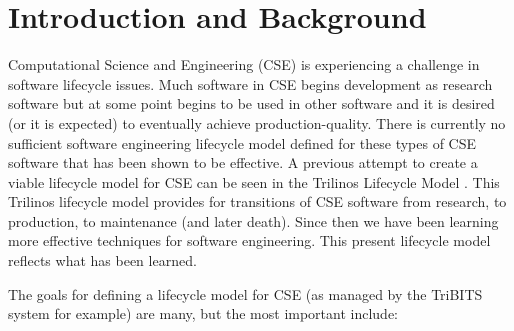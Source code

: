 \documentclass[11pt]{SANDreport}
\begin{document}
%
\SANDmain %




%
\section{Introduction and Background}
%

Computational Science and Engineering (CSE) is experiencing a challenge in software lifecycle issues.  Much software in CSE begins development as research software but at some point begins to be used in other software and it is desired (or it is expected) to eventually achieve production-quality.  There is currently no sufficient software engineering lifecycle model defined for these types of CSE software that has been shown to be effective.  A previous attempt to create a viable lifecycle model for CSE can be seen in the Trilinos Lifecycle Model {}\cite{TrilinosLifecycleModel2007}.  This Trilinos lifecycle model provides for transitions of CSE software from research, to production, to maintenance (and later death).  Since then we have been learning more effective techniques for software engineering.  This present lifecycle model reflects what has been learned.

The goals for defining a lifecycle model for CSE (as managed by the TriBITS system for example) are many, but the most important include:
\end{document}
